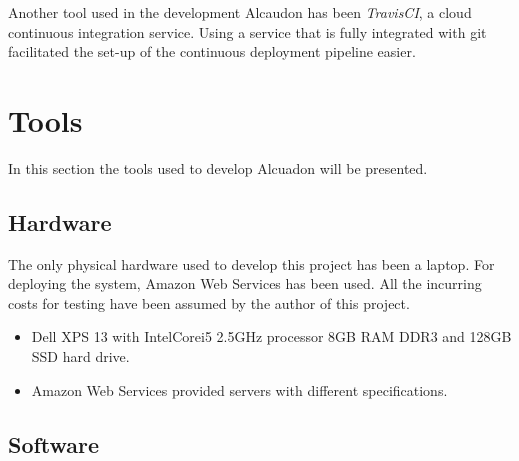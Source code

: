 Another tool used in the development Alcaudon has been \textit{TravisCI}, a
cloud continuous integration service. Using a service that is fully integrated
with git facilitated the set-up of the continuous deployment pipeline easier.

\section{Tools}

In this section the tools used to develop Alcuadon will be presented. 

\subsection{Hardware}

The only physical hardware used to develop this project has been a laptop. For
deploying the system, Amazon Web Services has been used. All the incurring costs
for testing have been assumed by the author of this project.

\begin{itemize}
  \item Dell XPS 13 with Intel\textregistered Core\texttrademark i5 2.5GHz
    processor 8GB RAM DDR3 and 128GB SSD hard drive.
  \item Amazon Web Services provided servers with different specifications.
\end{itemize}

\subsection{Software}

